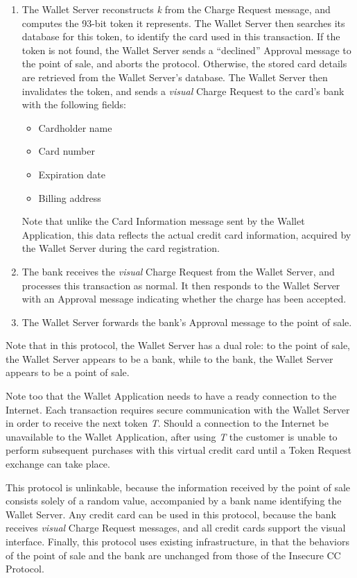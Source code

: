 \begin{enumerate}
\item The Wallet Server reconstructs \emph{k} from the Charge Request message, and computes the 93-bit token it represents.
    The Wallet Server then searches its database for this token, to identify the card used in this transaction.
    If the token is not found, the Wallet Server sends a ``declined'' Approval message to the point of sale, and aborts the protocol.
    Otherwise, the stored card details are retrieved from the Wallet Server's database.
    The Wallet Server then invalidates the token, and sends a \emph{visual} Charge Request to the card's bank with the following fields:
    \begin{itemize}
    \item Cardholder name
    \item Card number
    \item Expiration date
    \item Billing address
    \end{itemize}
    Note that unlike the Card Information message sent by the Wallet Application, this data reflects the actual credit card information,
        acquired by the Wallet Server during the card registration.

\item The bank receives the \emph{visual} Charge Request from the Wallet Server, and processes this transaction as normal.
    It then responds to the Wallet Server with an Approval message indicating whether the charge has been accepted.

\item The Wallet Server forwards the bank's Approval message to the point of sale.
\end{enumerate}

Note that in this protocol, the Wallet Server has a dual role:
to the point of sale, the Wallet Server appears to be a bank, while to the bank, the Wallet Server appears to be a point of sale.

Note too that the Wallet Application needs to have a ready connection to the Internet.
Each transaction requires secure communication with the Wallet Server in order to receive the next token \emph{T}.
Should a connection to the Internet be unavailable to the Wallet Application,
    after using \emph{T} the customer is unable to perform subsequent purchases with this virtual credit card until a Token Request exchange can take place.

This protocol is unlinkable,
    because the information received by the point of sale consists solely of a random value, accompanied by a bank name identifying the Wallet Server.
Any credit card can be used in this protocol,
    because the bank receives \emph{visual} Charge Request messages, and all credit cards support the visual interface.
Finally, this protocol uses existing infrastructure,
    in that the behaviors of the point of sale and the bank are unchanged from those of the Insecure CC Protocol.
